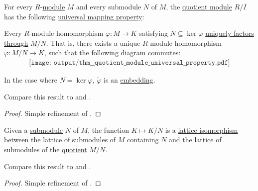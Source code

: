 \begin{theorem}\label{thm:quotient_module_universal_property}
  For every \( R \)-\hyperref[def:module]{module} \( M \) and every submodule \( N \) of \( M \), the \hyperref[def:module/quotient]{quotient module} \( R / I \) has the following \hyperref[rem:universal_mapping_property]{universal mapping property}:
  \begin{displayquote}
    Every \( R \)-module homomorphism \( \varphi: M \to K \) satisfying \( N \subseteq \ker \varphi \) \hyperref[def:factors_through]{uniquely factors through} \( M / N \). That is, there exists a unique \( R \)-module homomorphism \( \widetilde{\varphi}: M / N \to K \), such that the following diagram commutes:
    \begin{equation}\label{eq:thm:quotient_module_universal_property/diagram}
      \begin{aligned}
        \texttt{[image: output/thm\_\_quotient\_module\_universal\_property.pdf]}
      \end{aligned}
    \end{equation}

    In the case where \( N = \ker \varphi \), \( \widetilde{\varphi} \) is an \hyperref[def:first_order_homomorphism_invertibility/embedding]{embedding}.
  \end{displayquote}

  Compare this result to  and .
\end{theorem}
\begin{proof}
  Simple refinement of .
\end{proof}

\begin{theorem}\label{thm:quotient_submodule_lattice_theorem}
  Given a \hyperref[def:module/submodel]{submodule} \( N \) of \( M \), the function \( K \mapsto K / N \) is a \hyperref[def:semilattice/homomorphism]{lattice isomorphism} between the \hyperref[thm:substructures_form_complete_lattice]{lattice of submodules} of \( M \) containing \( N \) and the lattice of submodules of the \hyperref[def:module/quotient]{quotient} \( M / N \).

  Compare this result to  and .
\end{theorem}
\begin{proof}
  Simple refinement of .
\end{proof}

